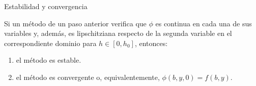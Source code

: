		\begin{frame}{Estabilidad y convergencia}
			\begin{theorem}
				Si un método de un paso anterior verifica que $\phi$ es continua en cada una de sus variables y, además, es lipschitziana respecto de la segunda variable en el correspondiente dominio para $h \in [0, h_0]$, entonces:
				
				\begin{enumerate}
					\item el método es estable.
					\item el método es convergente o, equivalentemente, $\phi(b,y,0) = f(b,y)$.
				\end{enumerate}
			\end{theorem}
		\end{frame}